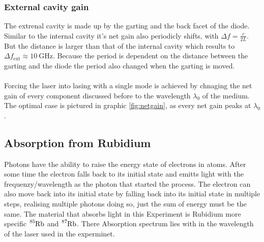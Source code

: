 \subsubsection{External cavity gain}
The extrenal cavity is made up by the garting and the back facet of the diode.
Similar to the internal cavity it's net gain also periodicly shifts, with $\Delta f = \frac{c}{2L}$.
\\
But the distance is larger than that of the internal cavity which results to $\Delta f_\text{ext} \approx \SI{10}{\giga\Hz}$.
Because the period is dependent on the distance between the garting and the diode the period also changed when the garting is moved.
\\\\
Forcing the laser into lasing with a single mode is achieved by chnaging the net gain of every component discussed before to the wavelength $\lambda_0$ of the medium.
The optimal case is pictured in graphic \ref{fig:netgain}, as every net gain peaks at $\lambda_0$.

\subsection{Absorption from Rubidium}
Photons have the ability to raise the energy state of electrons in atoms.
After some time the electron falls back to its initial state and emitts light with the frequenzy/wavelength as the photon that started the process.
The electron can also move back into its initial state by falling back into its initial state in multiple steps, realising multiple photons doing so, just the sum of energy must be the same.
The material that absorbs light in this Experiment is Rubidium more specific $\ce{^{85}Rb}$ and $\ce{^{87}Rb}$.
There Absorption spectrum lies with in the wavelength of the laser used in the experminet.

